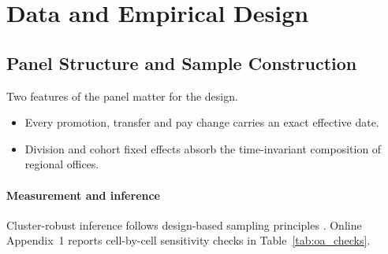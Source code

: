 \section{Data and Empirical Design}\label{sec:data}

\subsection{Panel Structure and Sample Construction}\label{sec:sample}

Two features of the panel matter for the design.
\begin{itemize}
  \item Every promotion, transfer and pay change carries an exact effective date.
  \item Division and cohort fixed effects absorb the time-invariant composition of regional offices.
\end{itemize}

\paragraph{Measurement and inference}
Cluster-robust inference follows design-based sampling principles \citep{abadie2023}. Online Appendix~1 reports cell-by-cell sensitivity checks in Table~\ref{tab:oa_checks}.
